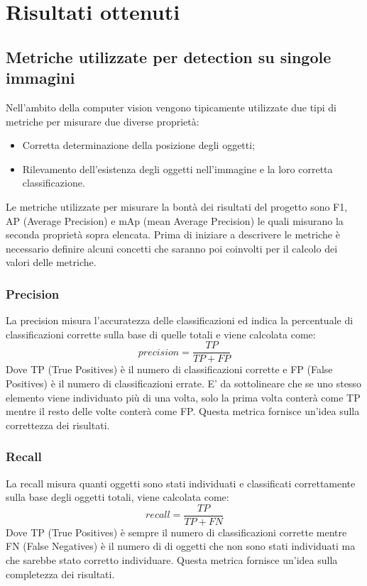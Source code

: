 \section{Risultati ottenuti}
\subsection{Metriche utilizzate per detection su singole immagini}
Nell'ambito della computer vision vengono tipicamente utilizzate due tipi di metriche per misurare due diverse proprietà:
\begin{itemize}
\item Corretta determinazione della posizione degli oggetti;
\item Rilevamento dell'esistenza degli oggetti nell'immagine e la loro corretta classificazione.
\end{itemize}
Le metriche utilizzate per misurare la bontà dei risultati del progetto sono F1, AP (Average Precision) e mAp (mean Average Precision)\cite{detectionmetrics} le quali misurano la seconda proprietà sopra elencata.
Prima di iniziare a descrivere le metriche è necessario definire alcuni concetti che saranno poi coinvolti per il calcolo dei valori delle metriche.
\subsubsection{Precision}
La precision misura l'accuratezza delle classificazioni ed indica la percentuale di classificazioni corrette sulla base di quelle totali e viene calcolata come:
\[
    precision = \frac{TP}{TP + FP}
\]
Dove TP (True Positives) è il numero di classificazioni corrette e FP (False Positives) è il numero di classificazioni errate. E' da sottolineare che se uno stesso elemento viene individuato più di una volta, solo la prima volta conterà come TP mentre il resto delle volte conterà come FP. Questa metrica fornisce un'idea sulla correttezza dei risultati.
\subsubsection{Recall}
La recall misura quanti oggetti sono stati individuati e classificati correttamente sulla base degli oggetti totali, viene calcolata come:
\[
    recall = \frac{TP}{TP + FN}
\]
Dove TP (True Positives) è sempre il numero di classificazioni corrette mentre FN (False Negatives) è il numero di di oggetti che non sono stati individuati ma che sarebbe stato corretto individuare. Questa metrica fornisce un'idea sulla completezza dei risultati.
